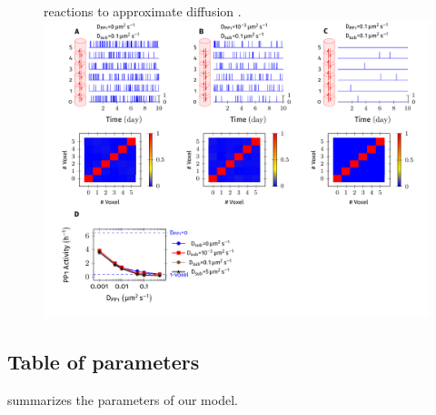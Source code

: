 \documentclass[9pt,lineno,doublespacing]{elife}
\begin{document}
\begin{figure}[ht!]
{        reactions to approximate diffusion \citep{isaacson_reaction-diffusion_2009}.
}{\includegraphics[width=\linewidth]{./PaperFigures/suppl/figure_pp1_profile.pdf}}
\label{figsupp:diffusion_reduces_pp1_potency} 
\end{figure}

\subsection{Table of parameters} 
 summarizes the parameters of our model.
\end{document}
